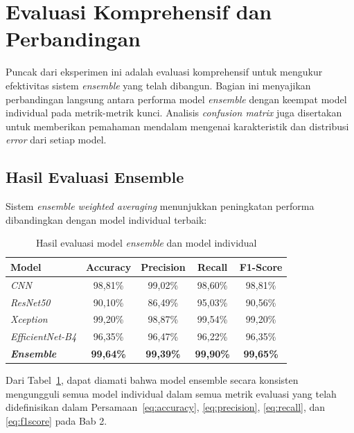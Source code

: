 \section{Evaluasi Komprehensif dan Perbandingan}

Puncak dari eksperimen ini adalah evaluasi komprehensif untuk mengukur efektivitas sistem \textit{ensemble} yang telah dibangun. Bagian ini menyajikan perbandingan langsung antara performa model \textit{ensemble} dengan keempat model individual pada metrik-metrik kunci. Analisis \textit{confusion matrix} juga disertakan untuk memberikan pemahaman mendalam mengenai karakteristik dan distribusi \textit{error} dari setiap model.

\subsection{Hasil Evaluasi Ensemble}

Sistem \textit{ensemble weighted averaging} menunjukkan peningkatan performa dibandingkan dengan model individual terbaik:

\begin{table}[h]
\centering
\caption{Hasil evaluasi model \textit{ensemble} dan model individual}
\label{tab:comprehensive_results}
\begin{tabular}{|l|c|c|c|c|}
\hline
\textbf{Model} & \textbf{Accuracy} & \textbf{Precision} & \textbf{Recall} & \textbf{F1-Score}  \\
\hline
\textit{CNN} & 98,81\% & 99,02\% & 98,60\% & 98,81\% \\
\textit{ResNet50} & 90,10\% & 86,49\% & 95,03\% & 90,56\%  \\
\textit{Xception} & 99,20\% & 98,87\% & 99,54\% & 99,20\%  \\
\textit{EfficientNet-B4} & 96,35\% & 96,47\% & 96,22\% & 96,35\%  \\
\hline
\textbf{\textit{Ensemble}} & \textbf{99,64\%} & \textbf{99,39\%} & \textbf{99,90\%} & \textbf{99,65\%}  \\
\hline
\end{tabular}
\end{table}

Dari Tabel~\ref{tab:comprehensive_results}, dapat diamati bahwa model ensemble secara konsisten mengungguli semua model individual dalam semua metrik evaluasi yang telah didefinisikan dalam Persamaan~\ref{eq:accuracy}, \ref{eq:precision}, \ref{eq:recall}, dan \ref{eq:f1score} pada Bab 2.


